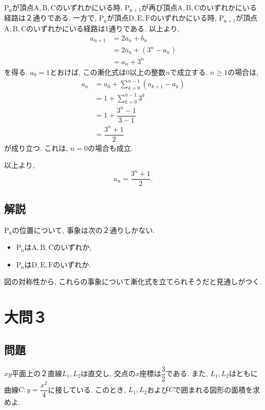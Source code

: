\documentclass[dvipdfmx,a4paper]{jsarticle}
\newcommand{\2}{I\hspace{-1pt}I}
\newcommand{\3}{I\hspace{-1pt}I\hspace{-1pt}I}
\begin{document}
    $\mathrm{P_n}$が頂点$\mathrm{A,B,C}$のいずれかにいる時, 
    $\mathrm{P_{n+1}}$が再び頂点$\mathrm{A,B,C}$のいずれかにいる経路は２通りである. 
    一方で, $\mathrm{P_n}$が頂点$\mathrm{D,E,F}$のいずれかにいる時, 
    $\mathrm{P_{n+1}}$が頂点$\mathrm{A,B,C}$のいずれかにいる経路は1通りである. 
    以上より, 
    \begin{align*}
        a_{n+1} &= 2a_n + b_n \\
                &= 2a_n + (3^n-a_n) \\
                &= a_n + 3^n
    \end{align*}
    を得る. $a_0=1$とおけば, この漸化式は0以上の整数$n$で成立する. 
    $n \geq 1$の場合は, 
    \begin{align*}\displaystyle
        a_n &= a_0 + \sum_{k=0}^{n-1} (a_{k+1} - a_k) \\
            &= 1 + \sum_{k=0}^{n-1} 3^k \\
            &= 1 + \dfrac{3^n-1}{3-1} \\
            &= \dfrac{3^n+1}{2}
    \end{align*}
    が成り立つ. これは, $n=0$の場合も成立. 

    以上より, 
    \begin{equation*}
        a_n = \dfrac{3^n+1}{2}.
    \end{equation*}
    

    \subsection{解説}
    $\mathrm{P_n}$の位置について, 事象は次の２通りしかない. 
    \begin{itemize}
        \item $\mathrm{P_n}$は$\mathrm{A, B, C}$のいずれか, 
        \item $\mathrm{P_n}$は$\mathrm{D, E, F}$のいずれか. 
    \end{itemize}
    図の対称性から, これらの事象について漸化式を立てられそうだと見通しがつく. 


    \section{大問３}
    \subsection{問題}
    $xy$平面上の２直線$L_1, L_2$は直交し, 交点の$x$座標は$\dfrac{3}{2}$である. また, 
    $L_1, L_2$はともに曲線$C: y = \dfrac{x^2}{4}$に接している. 
    このとき, $L_1, L_2$および$C$で囲まれる図形の面積を求めよ. 
\end{document}
